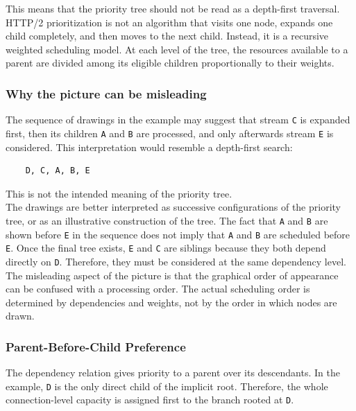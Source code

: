 \documentclass{scrbook}
\begin{document}
This means that the priority tree should not be read as a depth-first traversal. HTTP/2 prioritization is not an algorithm that visits one node, expands one child completely, and then moves to the next child. Instead, it is a recursive weighted scheduling model. At each level of the tree, the resources available to a parent are divided among its eligible children proportionally to their weights.

\subsubsection{Why the picture can be misleading}

The sequence of drawings in the example may suggest that stream \texttt{C} is expanded first, then its children \texttt{A} and \texttt{B} are processed, and only afterwards stream \texttt{E} is considered. This interpretation would resemble a depth-first search:

\begin{lstlisting}
	D, C, A, B, E
\end{lstlisting}

This is not the intended meaning of the priority tree.\\

The drawings are better interpreted as successive configurations of the priority tree, or as an illustrative construction of the tree. The fact that \texttt{A} and \texttt{B} are shown before \texttt{E} in the sequence does not imply that \texttt{A} and \texttt{B} are scheduled before \texttt{E}. Once the final tree exists, \texttt{E} and \texttt{C} are siblings because they both depend directly on \texttt{D}. Therefore, they must be considered at the same dependency level.\\

The misleading aspect of the picture is that the graphical order of appearance can be confused with a processing order. The actual scheduling order is determined by dependencies and weights, not by the order in which nodes are drawn.

\subsubsection{Parent-Before-Child Preference}

The dependency relation gives priority to a parent over its descendants. In the example, \texttt{D} is the only direct child of the implicit root. Therefore, the whole connection-level capacity is assigned first to the branch rooted at \texttt{D}.\\
\end{document}
